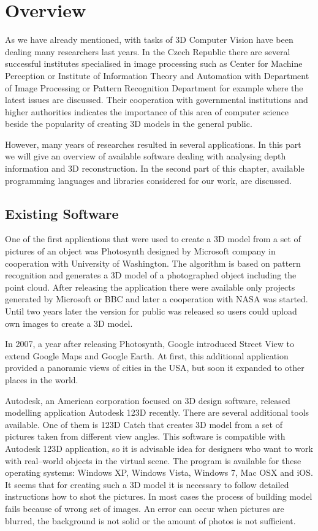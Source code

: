 \chapter{Overview}
As we have already mentioned, with tasks of 3D Computer Vision have been dealing 
many researchers last years. In the Czech Republic there are several successful 
institutes specialised in image processing such as Center for Machine Perception 
or Institute of Information Theory and Automation with Department of Image 
Processing or Pattern Recognition Department for example where the latest issues are discussed. 
Their cooperation with governmental institutions and higher authorities indicates the importance of 
this area of computer science beside the popularity of creating 3D models in the general public. 

However, many years of researches resulted in several applications.
In this part we will give an overview of available software dealing with 
analysing depth information and 3D reconstruction. 
In the second part of this chapter, available programming languages and libraries
 considered for our work, are discussed.

\section{Existing Software}
One of the first applications that were used to create a 3D model from a set of pictures of an object
was Photosynth designed by Microsoft company in cooperation with University of Washington. 
The algorithm is based on pattern recognition and generates a 3D model of a 
photographed object including the point cloud. After releasing the application there were available 
only projects generated by Microsoft or BBC and later a cooperation with NASA 
was started. Until two years later the version for public was released so users 
could upload own images to create a 3D model.

In 2007, a year after releasing Photosynth, Google introduced Street View to 
extend Google Maps and Google Earth. At first, this additional application provided a 
panoramic views of cities in the USA, but soon it expanded to other places in 
the world.

Autodesk, an American corporation focused on 3D design software, released 
modelling application Autodesk 123D recently. There are several additional tools 
available. One of them is 123D Catch that creates 3D model from a set of 
pictures taken from different view angles. This software is compatible with 
Autodesk 123D application, so it is advisable idea for designers who want to 
work with real–world objects in the virtual scene.
The program is available for these 
operating systems: Windows XP, Windows Vista, Windows 7, Mac OSX and iOS\@. It seems 
that for creating such a 3D model it is necessary to follow detailed 
instructions how to shot the pictures. In most cases the process of building model fails because of 
wrong set of images. An error can occur when pictures are blurred, the background 
is not solid or the amount of photos is not sufficient.

